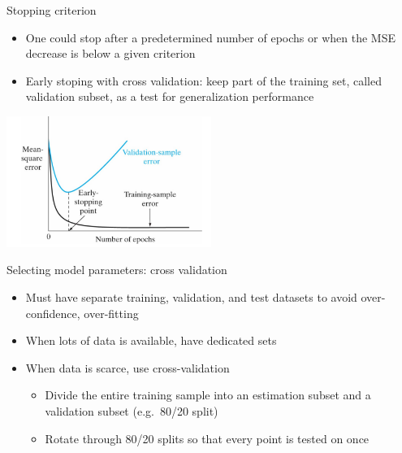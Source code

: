 \documentclass[notes]{beamer}
\providecommand{\tightlist}{%
  \setlength{\itemsep}{0pt}\setlength{\parskip}{0pt}}
\begin{document}
\begin{frame}{Stopping criterion}

\begin{itemize}
\tightlist
\item
  One could stop after a predetermined number of epochs or when the MSE
  decrease is below a given criterion
\item
  Early stoping with cross validation: keep part of the training set,
  called validation subset, as a test for generalization performance
\end{itemize}

\centering 

\includegraphics[width=0.50000\textwidth]{2018-03-10-16-00-59.png} ~

\end{frame}

\begin{frame}{Selecting model parameters: cross validation}

\begin{itemize}
\tightlist
\item
  Must have separate training, validation, and test datasets to avoid
  over-confidence, over-fitting
\item
  When lots of data is available, have dedicated sets
\item
  When data is scarce, use cross-validation

  \begin{itemize}
  \tightlist
  \item
    Divide the entire training sample into an estimation subset and a
    validation subset (e.g.~80/20 split)
  \item
    Rotate through 80/20 splits so that every point is tested on once
  \end{itemize}
\end{itemize}

\end{frame}
\end{document}
